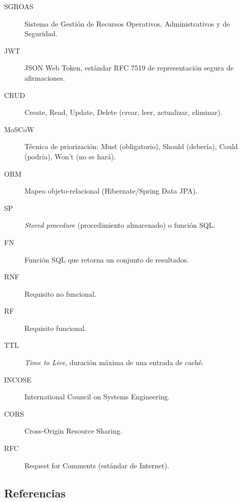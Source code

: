 \documentclass[12pt,a4paper]{article}
\begin{document}
\begin{description}
  \item[SGROAS] Sistema de Gestión de Recursos Operativos, Administrativos y de Seguridad.
  \item[JWT] JSON Web Token, estándar RFC 7519 de representación segura de afirmaciones.
  \item[CRUD] Create, Read, Update, Delete (crear, leer, actualizar, eliminar).
  \item[MoSCoW] Técnica de priorización: Must (obligatorio), Should (debería), Could (podría), Won't (no se hará).
  \item[ORM] Mapeo objeto-relacional (Hibernate/Spring Data JPA).
  \item[SP] \textit{Stored procedure} (procedimiento almacenado) o función SQL.
  \item[FN] Función SQL que retorna un conjunto de resultados.
  \item[RNF] Requisito no funcional.
  \item[RF] Requisito funcional.
  \item[TTL] \textit{Time to Live}, duración máxima de una entrada de caché.
  \item[INCOSE] International Council on Systems Engineering.
  \item[CORS] Cross-Origin Resource Sharing.
  \item[RFC] Request for Comments (estándar de Internet).
\end{description}

\subsection{Referencias}
\label{sec:referencias}
\end{document}
